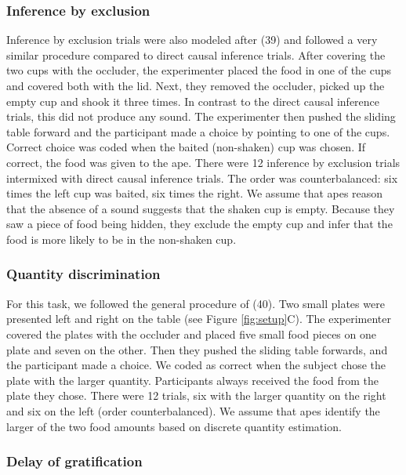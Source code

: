 \documentclass[
  man,floatsintext]{apa6}
\begin{document}
\hypertarget{inference-by-exclusion}{%
\subsubsection{Inference by exclusion}\label{inference-by-exclusion}}

Inference by exclusion trials were also modeled after (39) and followed a very similar procedure compared to direct causal inference trials. After covering the two cups with the occluder, the experimenter placed the food in one of the cups and covered both with the lid. Next, they removed the occluder, picked up the empty cup and shook it three times. In contrast to the direct causal inference trials, this did not produce any sound. The experimenter then pushed the sliding table forward and the participant made a choice by pointing to one of the cups. Correct choice was coded when the baited (non-shaken) cup was chosen. If correct, the food was given to the ape. There were 12 inference by exclusion trials intermixed with direct causal inference trials. The order was counterbalanced: six times the left cup was baited, six times the right. We assume that apes reason that the absence of a sound suggests that the shaken cup is empty. Because they saw a piece of food being hidden, they exclude the empty cup and infer that the food is more likely to be in the non-shaken cup.

\hypertarget{quantity-discrimination}{%
\subsubsection{Quantity discrimination}\label{quantity-discrimination}}

For this task, we followed the general procedure of (40). Two small plates were presented left and right on the table (see Figure \ref{fig:setup}C). The experimenter covered the plates with the occluder and placed five small food pieces on one plate and seven on the other. Then they pushed the sliding table forwards, and the participant made a choice. We coded as correct when the subject chose the plate with the larger quantity. Participants always received the food from the plate they chose. There were 12 trials, six with the larger quantity on the right and six on the left (order counterbalanced). We assume that apes identify the larger of the two food amounts based on discrete quantity estimation.

\hypertarget{delay-of-gratification}{%
\subsubsection{Delay of gratification}\label{delay-of-gratification}}
\end{document}
